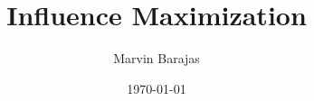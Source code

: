 \documentclass{article}
\title{Influence Maximization}
\author{Marvin Barajas}
\date{\today}			%
\begin{document}
\maketitle			%

	
\begin{thebibliography}{}
\end{thebibliography}
\end{document}
